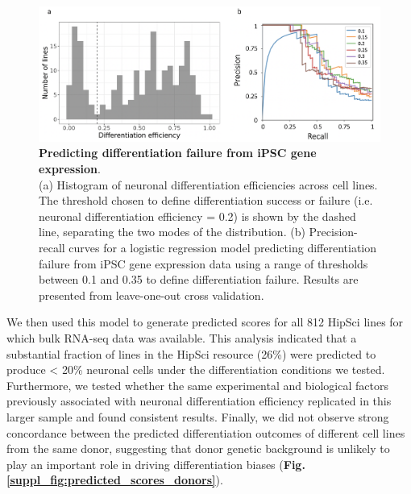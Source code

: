 \begin{figure}[h]
\centering
\includegraphics[width=15.5cm]{Chapter5/Fig/neuroseq_diff_eff_predict.png}
\caption[Predicting differentiation failure from iPSC gene expression]{\textbf{Predicting differentiation failure from iPSC gene expression}.\\
(a) Histogram of neuronal differentiation efficiencies across cell lines. 
The threshold chosen to define differentiation success or failure (i.e. neuronal differentiation efficiency = 0.2) is shown by the dashed line, separating the two modes of the distribution. 
(b) Precision-recall curves for a logistic regression model predicting differentiation failure from iPSC gene expression data \cite{bonder2019systematic} using a range of thresholds between 0.1 and 0.35 to define differentiation failure. 
Results are presented from leave-one-out cross validation.}
\label{fig:neuroseq_diff_eff_predictor}
\end{figure}

We then used this model to generate predicted scores for all 812 HipSci lines for which bulk RNA-seq data was available.
This analysis indicated that a substantial fraction of lines in the HipSci resource (26\%) were predicted to produce < 20\% neuronal cells under the differentiation conditions we tested.
Furthermore, we tested whether the same experimental and biological factors previously associated with neuronal differentiation efficiency replicated in this larger sample and found consistent results.
Finally, we did not observe strong concordance between the predicted differentiation outcomes of different cell lines from the same donor, suggesting that donor genetic background is unlikely to play an important role in driving differentiation biases (\textbf{Fig. \ref{suppl_fig:predicted_scores_donors}}).


